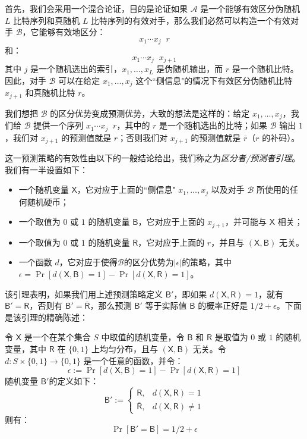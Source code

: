 首先，我们会采用一个混合论证，目的是论证如果 $\mathcal{A}$ 是一个能够有效区分伪随机 $L$ 比特序列和真随机 $L$ 比特序列的有效对手，那么我们必然可以构造一个有效对手 $\mathcal{B}$，它能够有效地区分：
\[
x_1\cdots x_j\;\;r
\]
和：
\[
x_1\cdots x_j\;\;x_{j+1}
\]
其中 $j$ 是一个随机选出的索引，$x_1,\dots,x_L$ 是伪随机输出，而 $r$ 是一个随机比特。因此，对手 $\mathcal{B}$ 可以在给定 $x_1,\dots,x_j$ 这个``侧信息"的情况下有效区分伪随机比特 $x_{j+1}$ 和真随机比特 $r$。

我们想把 $\mathcal{B}$ 的区分优势变成预测优势，大致的想法是这样的：给定 $x_1,\dots,x_j$，我们给 $\mathcal{B}$ 提供一个序列 $x_1\cdots x_j\;\;r$，其中的 $r$ 是一个随机选出的比特；如果 $\mathcal{B}$ 输出 $1$，我们对 $x_{j+1}$ 的预测值就是 $r$；否则我们对 $x_{j+1}$ 的预测值就是 $\overline r$（$r$ 的补码）。

这一预测策略的有效性由以下的一般结论给出，我们称之为\emph{区分者/预测者引理}。我们有一半设置如下：
\begin{itemize}
	\item 一个随机变量 $\mathsf{X}$，它对应于上面的``侧信息" $x_1,\dots,x_j$ 以及对手 $\mathcal{B}$ 所使用的任何随机硬币；
	\item 一个取值为 $0$ 或 $1$ 的随机变量 $\mathsf{B}$，它对应于上面的 $x_{j+1}$，并可能与 $\mathsf{X}$ 相关；
	\item 一个取值为 $0$ 或 $1$ 的随机变量 $\mathsf{R}$，它对应于上面的 $r$，并且与 $(\mathsf{X},\mathsf{B})$ 无关。
	\item 一个函数 $d$，它对应于使得$\mathcal{B}$的区分优势为$|\epsilon|$的策略，其中$\epsilon=\Pr[d(\mathsf{X},\mathsf{B})=1]-\Pr[d(\mathsf{X},\mathsf{R})=1]$。
\end{itemize}
该引理表明，如果我们用上述预测策略定义 $\mathsf{B}'$，即如果 $d(\mathsf{X},\mathsf{R})=1$，就有 $\mathsf{B}'=\mathsf{R}$，否则有 $\mathsf{B}'=\mathsf{\overline R}$，那么预测 $\mathsf{B}'$ 等于实际值 $\mathsf{B}$ 的概率正好是 ${1}/{2}+\epsilon$。下面是该引理的精确陈述：

\begin{lemma}\label{lemma:3-5}
令 $\mathsf{X}$ 是一个在某个集合 $S$ 中取值的随机变量，令 $\mathsf{B}$ 和 $\mathsf{R}$ 是取值为 $0$ 或 $1$ 的随机变量，其中 $\mathsf{R}$ 在 $\{0,1\}$ 上均匀分布，且与 $(\mathsf{X},\mathsf{B})$ 无关。令 $d:S\times\{0,1\}\to\{0,1\}$ 是一个任意的函数，并令：
\[
\epsilon:=\Pr[d(\mathsf{X},\mathsf{B})=1]-\Pr[d(\mathsf{X},\mathsf{R})=1]
\]
随机变量 $\mathsf{B}'$的定义如下：
\[
\mathsf{B}':=
\left\{
\begin{array}{ll}
\mathsf{R}, & d(\mathsf{X},\mathsf{R})=1\\
\mathsf{\overline R}, & d(\mathsf{X},\mathsf{R})\neq 1
\end{array}
\right.
\]
则有：
\[
\Pr[\mathsf{B}'=\mathsf{B}]={1}/{2}+\epsilon
\]
\end{lemma}

